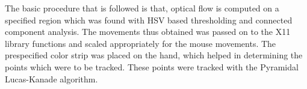 \documentclass{sig-alternate}
\begin{document}
The basic procedure that is followed is that, optical flow is computed on a specified 
region which was found with HSV based thresholding and connected component analysis.
The movements thus obtained was passed on to the X11 library functions and scaled appropriately
for the mouse movements. The prespecified color strip was placed on the hand, which helped in
determining the points which were to be tracked. These points were tracked with the Pyramidal Lucas-Kanade 
algorithm\cite{lucas81}.


%
%
\end{document}
